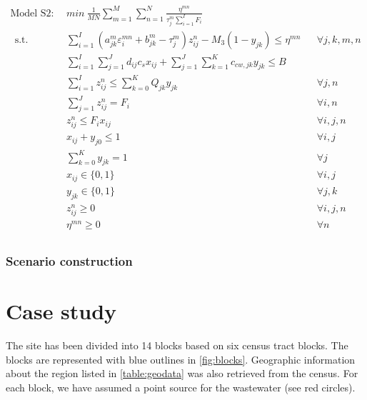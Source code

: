 \documentclass[preprint,12pt,authoryear]{elsarticle}
\renewcommand{\theequation}{\thesection--\arabic{equation}}
\begin{document}
\pagebreak
\setcounter{equation}{0}
\begin{align}\label{model:S2}
	\text{Model S2}:~~&min ~ \frac{1}{MN}\sum_{m=1}^M\sum_{n=1}^N \frac{\eta^{mn}}{\tau_j^m \sum_{i=1}^I F_i} \nonumber\\~~
	\mbox{s.t.}~~
	&\sum_{i=1}^I (a_{jk}^m \varepsilon_i^{mn} + b_{jk}^m - \tau_j^m) z_{ij}^n - M_3 (1 - y_{jk})\leq \eta^{mn} && \forall j,k,m,n\\	
	&\sum_{i=1}^{I}\sum_{j=1}^{J}d_{ij}c_s x_{ij} + \sum_{j=1}^{J}\sum_{k=1}^{K}c_{cw,jk}y_{jk} \leq B && \\
 	&\sum_{i=1}^{I} z_{ij}^n \leq \sum_{k=0}^K Q_{jk} y_{jk} && \forall j,n\\
	&\sum_{j=1}^J z_{ij}^n = F_i && \forall i,n\\
	&z_{ij}^n \leq F_i x_{ij} && \forall i,j,n\\
	&x_{ij} + y_{j0} \leq 1 && \forall i,j\\
	&\sum_{k=0}^{K}y_{jk} = 1&&\forall j\\
	&x_{ij} \in \{0,1\}&&\forall i,j\\
	&y_{jk} \in \{0,1\}&&\forall j,k\\
	&z_{ij}^n \geq 0&&\forall i,j,n\\ 
	&\eta^{mn} \geq 0&&\forall n\\
\end{align}
\renewcommand{\theequation}{\thesection--\arabic{equation}}
\newpage

\subsubsection{Scenario construction}\label{scengen}

\section{Case study}
The site has been divided into 14 blocks based on six census tract blocks. The blocks are represented with blue outlines in \autoref{fig:blocks}. Geographic information about the region listed in \autoref{table:geodata} was also retrieved from the census. \citep{acs2015} For each block, we have assumed a point source for the wastewater (see red circles).
\end{document}
